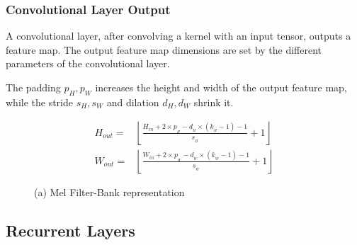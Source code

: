\subsubsection{Convolutional Layer Output}
A convolutional layer,
after convolving a kernel with an input tensor,
outputs a feature map. The output feature map dimensions
are set by the different parameters of the convolutional layer.

The padding \( p_{H}, p_{W} \) increases the height and width of
the output feature map, while the stride \( s_{H}, s_{W} \)
and dilation \( d_{H}, d_{W} \) shrink it.

\begin{align}
    H_{out} = & \left\lfloor\frac{H_{in}  + 2 \times p_{_{H}} - d_{_{H}}
    \times (k_{_{H}} - 1) - 1}{s_{_{H}}} + 1\right\rfloor                \\
    W_{out} = & \left\lfloor\frac{W_{in}  + 2 \times p_{_{W}} - d_{_{W}}
        \times (k_{_{W}} - 1) - 1}{s_{_{W}}} + 1\right\rfloor
\end{align}

\begin{figure}[H]
    \centering
    \caption{(a) Mel Filter-Bank representation}
\end{figure}



\subsection{Recurrent Layers}
